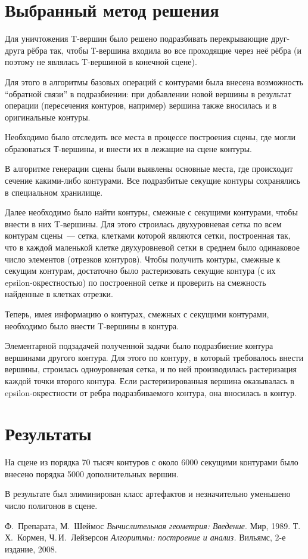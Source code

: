 \documentclass[a4paper,10pt,titlepage]{report}
\begin{document}
\section*{Выбранный метод решения}
Для уничтожения T-вершин было решено подразбивать перекрывающие друг-друга рёбра так, 
чтобы Т-вершина входила во все проходящие через неё рёбра 
(и поэтому не являлась T-вершиной в конечной сцене).

Для этого в алгоритмы базовых операций с контурами была внесена возможность ``обратной связи'' в подразбиении: 
при добавлении новой вершины в результат операции (пересечения контуров, например)
вершина также вносилась и в оригинальные контуры.

Необходимо было отследить все места в процессе построения сцены, 
где могли образоваться Т-вершины, и внести их в лежащие на сцене контуры.

В алгоритме генерации сцены были выявлены основные места, 
где происходит сечение какими-либо контурами.
Все подразбитые секущие контуры сохранялись в специальном хранилище.

Далее необходимо было найти контуры, смежные с секущими контурами, 
чтобы внести в них T-вершины.
Для этого строилась двухуровневая сетка по всем контурам сцены~---
сетка, клетками которой являются сетки, построенная так, 
что в каждой маленькой клетке двухуровневой сетки в среднем было одинаковое число элементов 
(отрезков контуров).
Чтобы получить контуры, смежные к секущим контурам, достаточно было растеризовать секущие 
контура (с их epsilon-окрестностью) по построенной сетке и проверить на смежность 
найденные в клетках отрезки.

Теперь, имея информацию о контурах, смежных с секущими контурами, 
необходимо было внести T-вершины в контура.

Элементарной подзадачей полученной задачи было подразбиение контура вершинами другого контура.
Для этого по контуру, в который требовалось внести вершины, строилась одноуровневая сетка, 
и по ней производилась растеризация каждой точки второго контура. 
Если растеризированная вершина оказывалась в epsilon-окрестности от ребра подразбиваемого контура, 
она вносилась в контур.

\section*{Результаты}
На сцене из порядка 70 тысяч контуров с около 6000 секущими контурами было внесено порядка 5000 дополнительных вершин.

В результате был элиминирован класс артефактов и незначительно уменьшено число полигонов в сцене.

\begin{thebibliography}{9}
  Ф.~Препарата, М.~Шеймос
  \emph{Вычислительная геометрия: Введение}.
  Мир,
  1989.
  Т.\,Х.~Кормен, Ч.\,И.~Лейзерсон
  \emph{Алгоритмы: построение и анализ.}
  Вильямс,
  2-е издание,
  2008.
\end{thebibliography}
\end{document}
